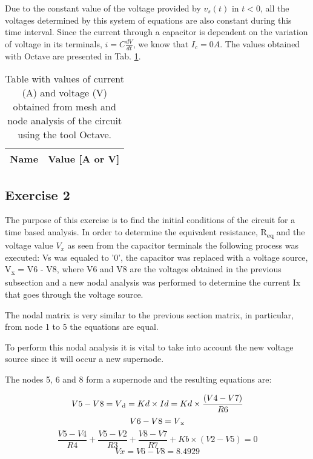 Due to the constant value of the voltage provided by $v_s(t)$ in $t<0$, all the voltages determined by this 
system of equations are also constant during this time interval. Since the current through a capacitor is dependent on the 
variation of voltage in its terminals, $i = C\frac{dV}{dt}$, we know that $I_c = 0 A$. The values obtained with Octave are
presented in Tab. \ref{tab:oct1}. 

\vspace{-20mm}
\begin{table}[h]
    \centering
    \begin{tabular}{|l|r|}
      \hline    
      {\bf Name} & {\bf Value [A or V]} \\ \hline
      
    \end{tabular}
    \caption{Table with values of current (A) and voltage (V) obtained from mesh and node analysis of the circuit using the tool Octave.}
    \label{tab:oct1}
\end{table}


\newpage
\subsection{Exercise 2}
\label{sec:t2}

The purpose of this exercise is to find the initial conditions of the circuit for a time based analysis.
In order to determine the equivalent resistance, R\textsubscript{eq} and the voltage value $V_x$ as seen from the capacitor terminals the following 
process was executed: Vs was equaled to '0', the capacitor was replaced with a voltage source, V\textsubscript{x} = V6 - V8, where V6 and V8 are the 
voltages obtained in the previous subsection and a new nodal analysis was performed to determine the current Ix that goes through the voltage source.

The nodal matrix is very similar to the previous section matrix, in particular, from node 1 to 5 the equations are equal.

To perform this nodal analysis it is vital to take into account the new voltage source since it will occur a new supernode. 

The nodes 5, 6 and 8 form a supernode and the resulting equations are:

\vspace{-2mm}
\begin{equation}
V5 - V8 = V\textsubscript{d} = Kd \times Id = Kd \times \frac{(V4 - V7)}{R6}
\end{equation}
\vspace{-2mm}
\begin{equation}
V6 - V8 = V\textsubscript{x} 
\end{equation}
\vspace{-2mm}
\begin{equation}
\frac{V5 - V4}{R4} + \frac{V5 - V2}{R3} + \frac{V8 - V7}{R7} + Kb\times(V2 - V5) = 0  
\end{equation}
\vspace{-2mm}
\begin{equation}
Vx = V6 - V8 = 8.4929
\end{equation}

